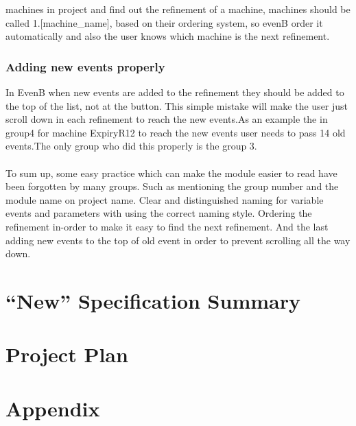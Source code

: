 machines in project and find out the refinement of a machine, machines should be called 1.[machine\_name], based on their ordering system, so evenB order it automatically and also the user knows which machine is the next refinement. 

\subsection{Adding new events properly}
\label{addingneweventsproperly}

In EvenB when new events are added to the refinement they should be added to the top of the list, not at the button. This simple mistake will make the user just scroll down in each refinement to reach the new events.As an example the in group4 for machine ExpiryR12 to reach the new events user needs to pass 14 old events.The only group who did this properly is the group 3.  \\ \\  To sum up, some easy practice which can make the module easier to read have been forgotten by many groups. Such as mentioning the group number and the module name on project name. Clear and distinguished naming for variable events and parameters with using the correct naming style. Ordering the refinement in-order to make it easy to find the next refinement. And the last adding new events to the top of old event in order to prevent scrolling all the way down.

\chapter{``New'' Specification Summary}
\label{newspecificationsummary}

\chapter{Project Plan}
\label{projectplan}

\chapter{Appendix}
\label{appendix}




